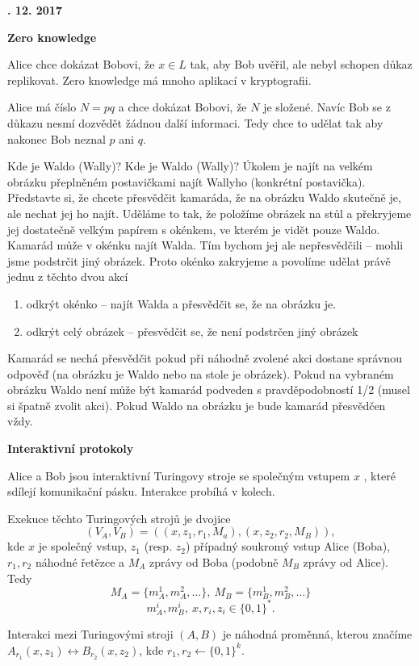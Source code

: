 \documentclass[a4paper,12pt,titlepage]{article}
\def\podnadpis#1{{\bigskip\bf\noindent#1\medskip\par}}
\begin{document}
\podnadpis{21. 12. 2017}

\podnadpis{Zero knowledge}

Alice chce dokázat Bobovi, že $x\in L$ tak, aby Bob uvěřil, ale nebyl schopen důkaz replikovat. Zero knowledge má mnoho aplikací v kryptografii.


Alice má číslo $N=pq$ a chce dokázat Bobovi, že $N$ je složené. Navíc Bob se z důkazu nesmí dozvědět žádnou další informaci. Tedy chce to udělat tak aby nakonec Bob neznal $p$ ani $q$.

\noindent Kde je Waldo (Wally)?
Kde je Waldo (Wally)? Úkolem je najít na velkém obrázku přeplněném postavičkami najít Wallyho (konkrétní postavička). Představte si, že chcete přesvědčit kamaráda, že na obrázku Waldo skutečně je, ale nechat jej ho najít. Uděláme to tak, že položíme obrázek na stůl a překryjeme jej dostatečně velkým papírem s okénkem, ve kterém je vidět pouze Waldo. Kamarád může v okénku najít Walda. Tím bychom jej ale nepřesvědčili -- mohli jsme podstrčit jiný obrázek. Proto okénko zakryjeme a povolíme udělat právě jednu z těchto dvou akcí
\begin{enumerate}
	\item  odkrýt okénko -- najít Walda a přesvědčit se, že na obrázku je.
	\item  odkrýt celý obrázek -- přesvědčit se, že není podstrčen jiný obrázek
	\end{enumerate}
	Kamarád se nechá přesvědčit pokud při náhodně zvolené akci dostane správnou odpověď (na obrázku je Waldo nebo na stole je obrázek).
	Pokud na vybraném obrázku Waldo není může být kamarád podveden s pravděpodobností 1/2 (musel si špatně zvolit akci). Pokud Waldo na obrázku je bude kamarád přesvědčen vždy.

\podnadpis{Interaktivní protokoly}

Alice a Bob jsou interaktivní Turingovy stroje se společným vstupem $x$ , které sdílejí komunikační pásku. Interakce probíhá v kolech.

Exekuce těchto Turingových strojů je dvojice
$$(V_A,V_B)=((x,z_1,r_1,M_a),(x,z_2,r_2,M_B)),$$
kde $x$ je společný vstup, $z_1$ (resp. $z_2$) případný soukromý vstup Alice (Boba), $r_1,r_2$ náhodné řetězce a $M_A$ zprávy od Boba (podobně $M_B$ zprávy od Alice). Tedy
$$M_A=\{m_A^1,m_A^2, \dots\},\ M_B=\{m_B^1,m_B^2, \dots\}$$
$$m_A^i,m_B^i,\ x,r_i,z_i\in \{0,1\}^*.$$

Interakci mezi Turingovými stroji $(A,B)$ je náhodná
proměnná, kterou značíme $A_{r_1}(x,z_1)\leftrightarrow
B_{r_2}(x,z_2)$, kde $r_1,r_2 \leftarrow \{0,1\}^k$.
\end{document}
